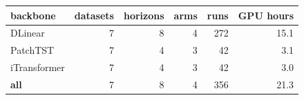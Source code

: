 \begin{tabular}{lrrrrr}
\toprule
backbone & datasets & horizons & arms & runs & GPU hours \\
\midrule
DLinear & 7 & 8 & 4 & 272 & 15.1 \\
PatchTST & 7 & 4 & 3 & 42 & 3.1 \\
iTransformer & 7 & 4 & 3 & 42 & 3.0 \\
\textbf{all} & 7 & 8 & 4 & 356 & 21.3 \\
\bottomrule
\end{tabular}